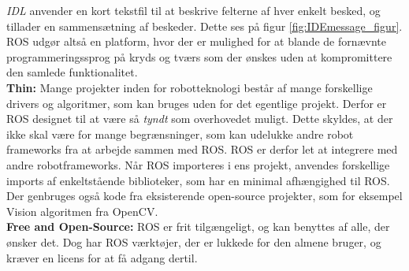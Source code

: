 \textit{IDL} anvender en kort tekstfil til at beskrive felterne af hver enkelt besked, og tillader en sammensætning af beskeder.
Dette ses på figur \ref{fig:IDEmessage_figur}.
ROS udgør altså en platform, hvor der er mulighed for at blande de fornævnte programmeringssprog på kryds og tværs som der ønskes uden at kompromittere den samlede funktionalitet.\\
\newline
\textbf{Thin:} Mange projekter inden for robotteknologi består af mange forskellige drivers og algoritmer, som kan bruges uden for det egentlige projekt.
Derfor er ROS designet til at være så \textit{tyndt} som overhovedet muligt.
Dette skyldes, at der ikke skal være for mange begrænsninger, som kan udelukke andre robot frameworks fra at arbejde sammen med ROS.
ROS er derfor let at integrere med andre robotframeworks.
Når ROS importeres i ens projekt, anvendes forskellige imports af enkeltstående biblioteker, som har en minimal afhængighed til ROS.
Der genbruges også kode fra eksisterende open-source projekter, som for eksempel Vision algoritmen fra OpenCV.\\
\newline
\textbf{Free and Open-Source:}
ROS er frit tilgængeligt, og kan benyttes af alle, der ønsker det.
Dog har ROS værktøjer, der er lukkede for den almene bruger, og kræver en licens for at få adgang dertil.